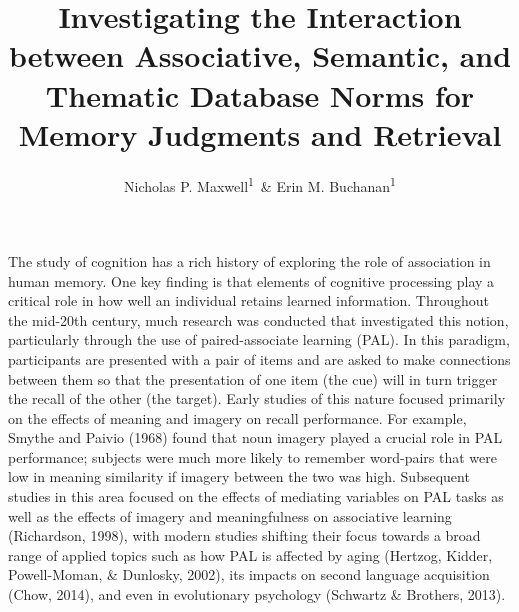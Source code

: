 \documentclass[english,man]{apa6}
\title{Investigating the Interaction between Associative, Semantic, and
Thematic Database Norms for Memory Judgments and Retrieval}
\author{Nicholas P. Maxwell\textsuperscript{1}~\& Erin M. Buchanan\textsuperscript{1}}
\affiliation{
    \vspace{0.5cm}
          \textsuperscript{1} Missouri State University  }
\theoremstyle{definition}
\theoremstyle{definition}
\theoremstyle{remark}
\begin{document}
\maketitle

\setcounter{secnumdepth}{0}



The study of cognition has a rich history of exploring the role of
association in human memory. One key finding is that elements of
cognitive processing play a critical role in how well an individual
retains learned information. Throughout the mid-20th century, much
research was conducted that investigated this notion, particularly
through the use of paired-associate learning (PAL). In this paradigm,
participants are presented with a pair of items and are asked to make
connections between them so that the presentation of one item (the cue)
will in turn trigger the recall of the other (the target). Early studies
of this nature focused primarily on the effects of meaning and imagery
on recall performance. For example, Smythe and Paivio (1968) found that
noun imagery played a crucial role in PAL performance; subjects were
much more likely to remember word-pairs that were low in meaning
similarity if imagery between the two was high. Subsequent studies in
this area focused on the effects of mediating variables on PAL tasks as
well as the effects of imagery and meaningfulness on associative
learning (Richardson, 1998), with modern studies shifting their focus
towards a broad range of applied topics such as how PAL is affected by
aging (Hertzog, Kidder, Powell-Moman, \& Dunlosky, 2002), its impacts on
second language acquisition (Chow, 2014), and even in evolutionary
psychology (Schwartz \& Brothers, 2013).
\end{document}
